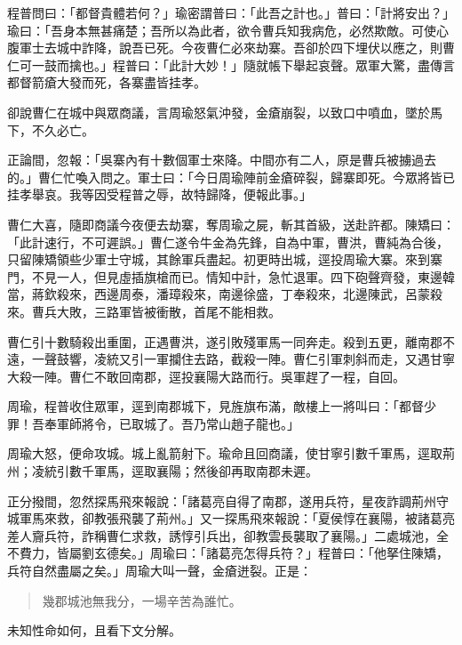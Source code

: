 程普問曰：「都督貴體若何？」瑜密謂普曰：「此吾之計也。」普曰：「計將安出？」瑜曰：「吾身本無甚痛楚；吾所以為此者，欲令曹兵知我病危，必然欺敵。可使心腹軍士去城中詐降，說吾已死。今夜曹仁必來劫寨。吾卻於四下埋伏以應之，則曹仁可一鼓而擒也。」程普曰：「此計大妙！」隨就帳下舉起哀聲。眾軍大驚，盡傳言都督箭瘡大發而死，各寨盡皆挂孝。

卻說曹仁在城中與眾商議，言周瑜怒氣沖發，金瘡崩裂，以致口中噴血，墜於馬下，不久必亡。

正論間，忽報：「吳寨內有十數個軍士來降。中間亦有二人，原是曹兵被擄過去的。」曹仁忙喚入問之。軍士曰：「今日周瑜陣前金瘡碎裂，歸寨即死。今眾將皆已挂孝舉哀。我等因受程普之辱，故特歸降，便報此事。」

曹仁大喜，隨即商議今夜便去劫寨，奪周瑜之屍，斬其首級，送赴許都。陳矯曰：「此計速行，不可遲誤。」曹仁遂令牛金為先鋒，自為中軍，曹洪，曹純為合後，只留陳矯領些少軍士守城，其餘軍兵盡起。初更時出城，逕投周瑜大寨。來到寨門，不見一人，但見虛插旗槍而已。情知中計，急忙退軍。四下砲聲齊發，東邊韓當，蔣欽殺來，西邊周泰，潘璋殺來，南邊徐盛，丁奉殺來，北邊陳武，呂蒙殺來。曹兵大敗，三路軍皆被衝散，首尾不能相救。

曹仁引十數騎殺出重圍，正遇曹洪，遂引敗殘軍馬一同奔走。殺到五更，離南郡不遠，一聲鼓響，凌統又引一軍攔住去路，截殺一陣。曹仁引軍刺斜而走，又遇甘寧大殺一陣。曹仁不敢回南郡，逕投襄陽大路而行。吳軍趕了一程，自回。

周瑜，程普收住眾軍，逕到南郡城下，見旌旗布滿，敵樓上一將叫曰：「都督少罪！吾奉軍師將令，已取城了。吾乃常山趙子龍也。」

周瑜大怒，便命攻城。城上亂箭射下。瑜命且回商議，使甘寧引數千軍馬，逕取荊州；凌統引數千軍馬，逕取襄陽；然後卻再取南郡未遲。

正分撥間，忽然探馬飛來報說：「諸葛亮自得了南郡，遂用兵符，星夜詐調荊州守城軍馬來救，卻教張飛襲了荊州。」又一探馬飛來報說：「夏侯惇在襄陽，被諸葛亮差人齎兵符，詐稱曹仁求救，誘惇引兵出，卻教雲長襲取了襄陽。」二處城池，全不費力，皆屬劉玄德矣。」周瑜曰：「諸葛亮怎得兵符？」程普曰：「他拏住陳矯，兵符自然盡屬之矣。」周瑜大叫一聲，金瘡迸裂。正是：

\begin{quote}
幾郡城池無我分，一場辛苦為誰忙。
\end{quote}

未知性命如何，且看下文分解。
